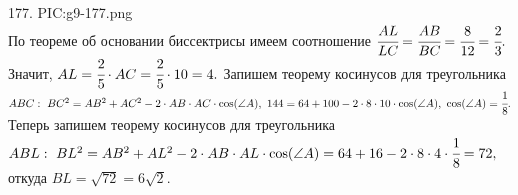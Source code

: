 177. {{PIC:g9-177.png}}\\
По теореме об основании биссектрисы имеем соотношение $\cfrac{AL}{LC}=\cfrac{AB}{BC}=\cfrac{8}{12}=\cfrac{2}{3}.$ Значит, $AL=\cfrac{2}{5}\cdot AC=\cfrac{2}{5}\cdot10=4.$ Запишем теорему косинусов для треугольника $ABC:\ BC^2=AB^2+AC^2-2\cdot AB\cdot AC\cdot \cos(\angle A),\ 144=64+100-2\cdot8\cdot10\cdot
\cos(\angle A),\ \cos(\angle A)=\cfrac{1}{8}.$ Теперь запишем теорему косинусов для треугольника $ABL:\ BL^2=AB^2+AL^2-2\cdot AB\cdot AL\cdot \cos(\angle A)=
64+16-2\cdot8\cdot4\cdot\cfrac{1}{8}=72,$ откуда $BL=\sqrt{72}=6\sqrt{2}.$\newpage\noindent

